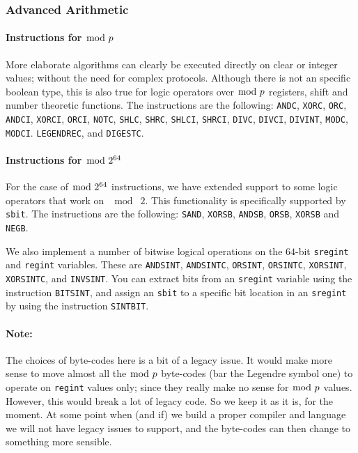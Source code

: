 \subsubsection{Advanced Arithmetic}
\paragraph{Instructions for $\bmod \; p$}
More elaborate algorithms can clearly be executed directly on
clear or integer values; without the need for complex
protocols. Although there is not an specific boolean type, this is also true for logic operators over $\bmod \; p$ registers, shift and number
theoretic functions. The instructions are the following:
    \verb+ANDC+,
    \verb+XORC+,
    \verb+ORC+,
    \verb+ANDCI+,
    \verb+XORCI+,
    \verb+ORCI+,
    \verb+NOTC+,
    \verb+SHLC+,
    \verb+SHRC+,
    \verb+SHLCI+,
    \verb+SHRCI+,
    \verb+DIVC+,
    \verb+DIVCI+,
    \verb+DIVINT+,
    \verb+MODC+,
    \verb+MODCI+.
    \verb+LEGENDREC+,
and
    \verb+DIGESTC+.
\paragraph{Instructions for $\bmod \; 2^{64}$}
For the case of $\bmod \; 2^{64}$ instructions, we have extended support to some logic operators that work on $\mod \; 2$.
This functionality is specifically supported by \verb+sbit+.
The instructions are the following:
\verb+SAND+,
\verb+XORSB+,
\verb+ANDSB+,
\verb+ORSB+,
\verb+XORSB+ and
\verb+NEGB+.

We also implement a number of bitwise logical operations on the $64$-bit
\verb|sregint| and \verb|regint| variables. These are
\verb+ANDSINT+,
\verb+ANDSINTC+,
\verb+ORSINT+,
\verb+ORSINTC+,
\verb+XORSINT+,
\verb+XORSINTC+,
and
\verb+INVSINT+.
You can extract bits from an \verb|sregint| variable using the instruction
\verb+BITSINT+, and assign an \verb|sbit| to a specific bit location in
an \verb|sregint| by using the instruction \verb+SINTBIT+.

\paragraph{Note:}
The choices of byte-codes here is a bit of a legacy issue. It would
make more sense to move almost all the $\bmod \; p$ byte-codes (bar the Legendre symbol
one) to operate on \verb|regint| values only; since they really make
no sense for $\bmod \; p$ values. However, this would break a lot of legacy code.
So we keep it as it is, for the moment. At some point when (and if) we build a proper
compiler and language we will not have legacy issues to support, and the
byte-codes can then change to something more sensible.

